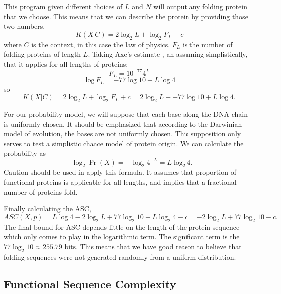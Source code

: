 This program given different choices of $L$ and $N$ will output any folding protein that we choose.
This means that we can describe the protein by providing those two numbers.
\begin{equation}
    K(X|C) = 2 \log_2 L + \log_2 F_L + c
\end{equation} where $C$ is the context, in this case the law of physics.
$F_L$ is the number of folding proteins of length $L$.
Taking Axe's estimate \cite{axe2004}, an assuming simplistically, that it applies for all lengths of proteins:
\begin{equation}
    F_L = 10^{-77} 4^L 
\end{equation}
\begin{equation}
    \log F_L = -77 \log 10 + L \log 4
\end{equation}
so
\begin{equation}
    K(X|C) = 2 \log_2 L + \log_2 F_L + c = 2 \log_2 L + -77 \log 10  + L \log 4 \mbox{.}
\end{equation}

For our probability model, we will suppose that each base along the DNA chain is uniformly chosen.
It should be emphasized that according to the Darwinian model of evolution, the bases are not uniformly chosen.
This supposition only serves to test a simplistic chance model of protein origin.
We can calculate the probability as
\begin{equation}
    -\log_2 \Pr(X) =  -\log_2 4^{-L} = L \log_2 4 \mbox{.}
\end{equation}
Caution should be used in apply this formula.
It assumes that proportion of functional proteins is applicable for all lengths, and implies that a fractional number of proteins fold.

Finally calculating the ASC,
\begin{equation}
    ASC(X,p) = L \log 4 - 2 \log_2 L + 77 \log_2 10 - L \log_2 4 - c
    = - 2 \log_2 L + 77 \log_2 10 - c \mbox{.}
\end{equation}
The final bound for ASC depends little on the length of the protein sequence which only comes to play in the logarithmic term.
The significant term is the $77 \log_2 10 \approx 255.79 \mbox{ bits}$.
This means that we have good reason to believe that folding sequences were not generated randomly from a uniform distribution.

\subsection{Functional Sequence Complexity}

